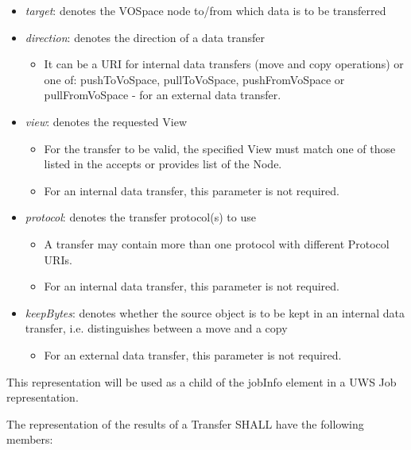 \documentclass[11pt,a4paper]{ivoa}
\begin{document}
\begin{itemize}
    \item \emph{target}: denotes the VOSpace node to/from which data is to be transferred
    \item \emph{direction}: denotes the direction of a data transfer
        \begin{itemize}
            \item It can be a URI for internal data transfers (move and copy operations) or one of: pushToVoSpace, pullToVoSpace, pushFromVoSpace or pullFromVoSpace - for an external data transfer.
        \end{itemize}
    \item \emph{view}: denotes the requested View
        \begin{itemize}
            \item For the transfer to be valid, the specified View must match one of those listed in the accepts or provides list of the Node.
            \item For an internal data transfer, this parameter is not required.
        \end{itemize}
    \item \emph{protocol}: denotes the transfer protocol(s) to use
        \begin{itemize}
            \item A transfer may contain more than one protocol with different Protocol URIs.
            \item For an internal data transfer, this parameter is not required.
        \end{itemize}
    \item \emph{keepBytes}: denotes whether the source object is to be kept in an internal data transfer, i.e. distinguishes between a move and a copy
        \begin{itemize}
            \item For an external data transfer, this parameter is not required.
        \end{itemize}
\end{itemize}

This representation will be used as a child of the jobInfo element in a UWS Job representation.

The representation of the results of a Transfer SHALL have the following members:
\end{document}
